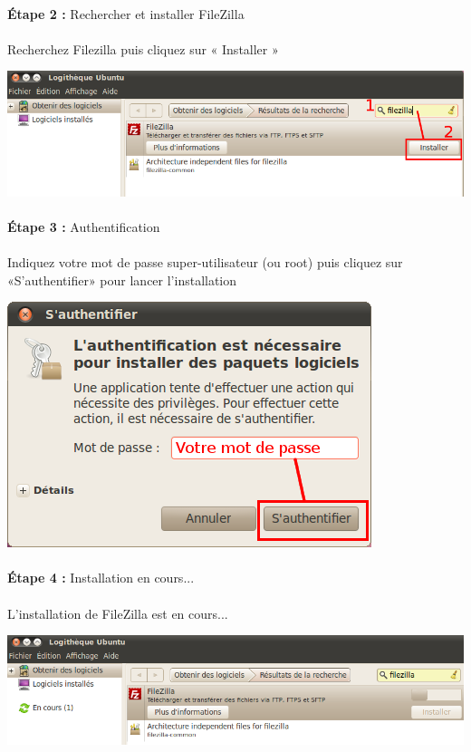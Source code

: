 \documentclass[10pt,a4paper]{article}
\begin{document}
\paragraph{}\textbf{Étape 2 : }Rechercher et installer FileZilla
\paragraph{}Recherchez Filezilla puis cliquez sur « Installer »
\begin{center}
\includegraphics[scale=0.4]{img/0024.png}
\end{center}
\paragraph{}\textbf{Étape 3 : }Authentification
\paragraph{}Indiquez votre mot de passe super-utilisateur (ou root) puis cliquez sur «S'authentifier» pour lancer l'installation
\begin{center}
\includegraphics[scale=0.4]{img/0025.png}
\end{center}
\paragraph{}\textbf{Étape 4 : }Installation en cours...
\paragraph{}L'installation de FileZilla est en cours...
\begin{center}
\includegraphics[scale=0.4]{img/0026.png}
\end{center}
\end{document}
